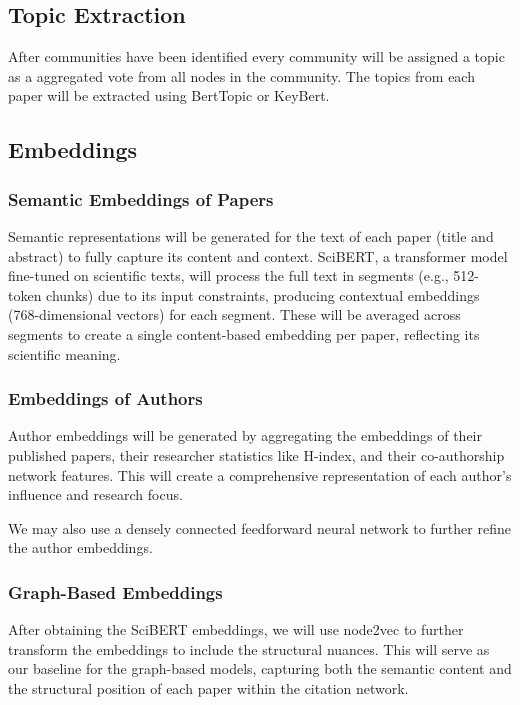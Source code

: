 \documentclass[a4paper,12pt]{article}
\begin{document}
\subsection{Topic Extraction}
After communities have been identified every community will be assigned a topic
as a aggregated vote from all nodes in the community. The topics from each paper
will be extracted using BertTopic\parencite{grootendorst_bertopic_2022} or KeyBert\parencite{issa_comparative_2023}.

\subsection{Embeddings}
\subsubsection{Semantic Embeddings of Papers}
Semantic representations will be generated for the text of each paper (title and abstract) 
to fully capture its content and context. SciBERT\parencite{beltagy_scibert_2019}, a 
transformer model fine-tuned on scientific texts, will process the full text in segments 
(e.g., 512-token chunks) due to its input constraints, producing contextual embeddings 
(768-dimensional vectors) for each segment. These will be averaged across segments to create 
a single content-based embedding per paper, reflecting its scientific meaning. 

\subsubsection{Embeddings of Authors}
Author embeddings will be generated by aggregating the embeddings of their published papers, 
their researcher statistics like H-index, and their co-authorship network features. This 
will create a comprehensive representation of each author's influence and research focus.

We may also use a densely connected feedforward neural network to further refine the author 
embeddings.

\subsubsection{Graph-Based Embeddings}
After obtaining the SciBERT embeddings, we will use node2vec\parencite{grover_node2vec_2016} 
to further transform the embeddings to include the structural nuances. This will serve as our 
baseline for the graph-based models, capturing both the semantic content and the structural 
position of each paper within the citation network.
\end{document}

